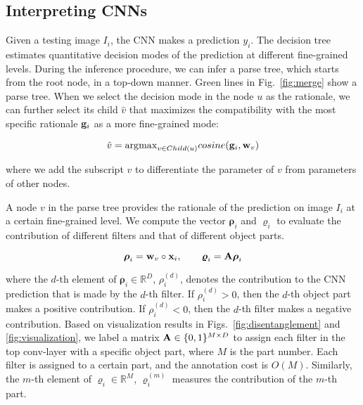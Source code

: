\documentclass[10pt,twocolumn,letterpaper]{article}
\begin{document}
\subsection{Interpreting CNNs}

Given a testing image $I_{i}$, the CNN makes a prediction $y_{i}$. The decision tree estimates quantitative decision modes of the prediction at different fine-grained levels. During the inference procedure, we can infer a parse tree, which starts from the root node, in a top-down manner. Green lines in Fig.~\ref{fig:merge} show a parse tree. When we select the decision mode in the node $u$ as the rationale, we can further select its child $\hat{v}$ that maximizes the compatibility with the most specific rationale {\small${\bf g}_{i}$} as a more fine-grained mode:
\begin{small}
\begin{equation}
\hat{v}={\arg\!\max}_{v\in Child(u)}cosine({\bf g}_{i},{\bf w}_{v})
\end{equation}
\end{small}
where we add the subscript $v$ to differentiate the parameter of $v$ from parameters of other nodes.

A node $v$ in the parse tree provides the rationale of the prediction on image $I_{i}$ at a certain fine-grained level. We compute the vector ${\boldsymbol\rho}_{i}$ and ${\boldsymbol\varrho}_{i}$ to evaluate the contribution of different filters and that of different object parts.
\begin{small}
\begin{equation}
{\boldsymbol\rho}_{i}={\bf w}_{v}\circ{\bf x}_{i},\qquad{\boldsymbol\varrho}_{i}={\bf A}{\boldsymbol\rho}_{i}
\label{eqn:contri}
\end{equation}
\end{small}
where the $d$-th element of {\small${\boldsymbol\rho}_{i}\in\mathbb{R}^{D}$}, {\small$\rho_{i}^{(d)}$}, denotes the contribution to the CNN prediction that is made by the $d$-th filter. If {\small$\rho_{i}^{(d)}>0$}, then the $d$-th object part makes a positive contribution. If {\small$\rho_{i}^{(d)}<0$}, then the $d$-th filter makes a negative contribution. Based on visualization results in Figs.~\ref{fig:disentanglement} and \ref{fig:visualization}, we label a matrix {\small${\bf A}\in\{0,1\}^{M\times D}$} to assign each filter in the top conv-layer with a specific object part, where $M$ is the part number. Each filter is assigned to a certain part, and the annotation cost is {\small$O(M)$}. Similarly, the $m$-th element of {\small${\boldsymbol\varrho}_{i}\in\mathbb{R}^{M}$}, {\small$\varrho_{i}^{(m)}$} measures the contribution of the $m$-th part.
\end{document}
